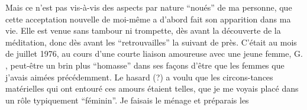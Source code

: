 Mais ce n'est pas vis-à-vis des aspects par nature ``noués'' de ma personne, que cette acceptation nouvelle de moi-même a d'abord fait son apparition dans ma vie. Elle est venue sans tambour ni trompette, dès avant la découverte de la méditation, donc dès avant les ``retrouvailles'' la suivant de près. C'était au mois de juillet 1976, au cours d'une courte liaison amoureuse avec une jeune femme, G. , peut-être un brin plus ``homasse'' dans ses façons d'être que les femmes que j'avais aimées précédemment. Le hasard (?) a voulu que les circons-\linebreak tances matérielles qui ont entouré ces amours étaient telles, que je me voyais placé dans un rôle typiquement ``féminin''. Je faisais le ménage et préparais les
\margin{--}

